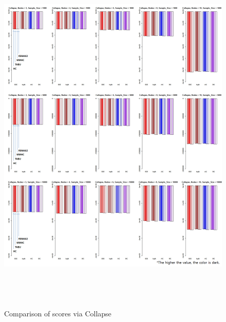 	\begin{figure}[p]
	\centering
		\includegraphics[height=500pt]{01_Collapse_Score}
		\caption{Comparison of scores via Collapse}
	\end{figure}	

